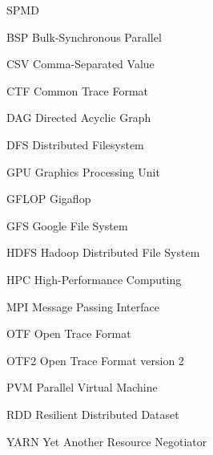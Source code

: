 \begin{listofabbrv}{SPMD}
	\item[BSP] Bulk-Synchronous Parallel
	\item[CSV] Comma-Separated Value
	\item[CTF] Common Trace Format
        \item[DAG] Directed Acyclic Graph
        \item[DFS] Distributed Filesystem
        \item[GPU] Graphics Processing Unit
        \item[GFLOP] Gigaflop
        \item[GFS] Google File System
        \item[HDFS] Hadoop Distributed File System
        \item[HPC] High-Performance Computing
        \item[MPI] Message Passing Interface
        \item[OTF] Open Trace Format
        \item[OTF2] Open Trace Format version 2
        \item[PVM] Parallel Virtual Machine
        \item[RDD] Resilient Distributed Dataset
        \item[YARN] Yet Another Resource Negotiator
\end{listofabbrv}


\listoffigures

\listoftables

\tableofcontents